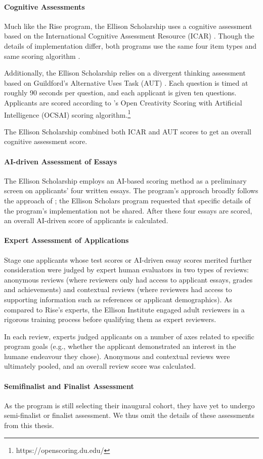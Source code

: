 \paragraph{Cognitive Assessments} 
Much like the Rise program, the Ellison Scholarship uses a cognitive assessment based on the International Cognitive Assessment Resource (ICAR) \cite{condon2014international,subotic2020psychometric}. Though the details of implementation differ, both programs use the same four item types and same scoring algorithm \cite{burkner2021bayesian}.

Additionally, the Ellison Scholarship relies on a divergent thinking assessment based on Guildford's Alternative Uses Task (AUT) \cite{citation needed}. Each question is timed at roughly 90 seconds per question, and each applicant is given ten questions. Applicants are scored according to \textcite{organisciak_beyond_2023}'s Open Creativity Scoring with Artificial Intelligence (OCSAI) scoring algorithm.\footnote{https://openscoring.du.edu/}

The Ellison Scholarship combined both ICAR and AUT scores to get an overall cognitive assessment score.

\paragraph{AI-driven Assessment of Essays}
The Ellison Scholarship employs an AI-based scoring method as a preliminary screen on applicants' four written essays. The program's approach broadly follows the approach of \textcite{xiao2024humanaicollaborativeessayscoring}; the Ellison Scholars program requested that specific details of the program's implementation not be shared. After these four essays are scored, an overall AI-driven score of applicants is calculated.

\paragraph{Expert Assessment of Applications}
Stage one applicants whose test scores or AI-driven essay scores merited further consideration were judged by expert human evaluators in two types of reviews: anonymous reviews (where reviewers only had access to applicant essays, grades and achievements) and contextual reviews (where reviewers had access to supporting information such as references or applicant demographics). As compared to Rise's experts, the Ellison Institute engaged adult reviewers in a rigorous training process before qualifying them as expert reviewers.

In each review, experts judged applicants on a number of axes related to specific program goals (e.g., whether the applicant demonstrated an interest in the humane endeavour they chose). Anonymous and contextual reviews were ultimately pooled, and an overall review score was calculated.

\paragraph{Semifinalist and Finalist Assessment}
As the program is still selecting their inaugural cohort, they have yet to undergo semi-finalist or finalist assessment. We thus omit the details of these assessments from this thesis.